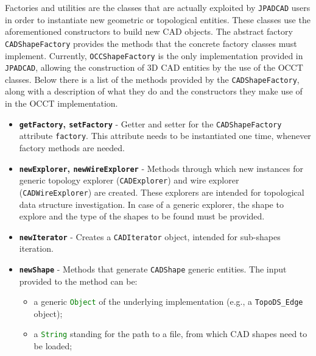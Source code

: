 Factories and utilities are the classes that are actually exploited by \lstinline[language=Java]!JPADCAD! users in order to instantiate new geometric or topological entities. These classes use the aforementioned constructors to build new \gls{CAD} objects. The abstract factory \lstinline[language=Java]!CADShapeFactory! provides the methods that the concrete factory classes must implement. Currently, \lstinline[language=Java]!OCCShapeFactory! is the only implementation provided in \lstinline[language=Java]!JPADCAD!, allowing the construction of 3D \gls{CAD} entities by the use of the \gls{OCCT} classes. Below there is a list of the methods provided by the \lstinline[language=Java]!CADShapeFactory!, along with a description of what they do and the constructors they make use of in the \gls{OCCT} implementation.
%
\begin{itemize}
\renewcommand\labelitemi{\tiny$\blacksquare$}
\renewcommand\labelitemii{\tiny$\bullet$}
\item \textbf{\lstinline[language=Java]!getFactory!, \lstinline[language=Java]!setFactory!} - Getter and setter for the \lstinline[language=Java]!CADShapeFactory! attribute \lstinline[language=Java]!factory!. This attribute needs to be instantiated one time, whenever factory methods are needed.
\item \textbf{\lstinline[language=Java]!newExplorer!, \lstinline[language=Java]!newWireExplorer!} - Methods through which new instances for generic topology explorer (\lstinline[language=Java]!CADExplorer!) and wire explorer (\lstinline[language=Java]!CADWireExplorer!) are created. These explorers are intended for topological data structure investigation. In case of a generic explorer, the shape to explore and the type of the shapes to be found must be provided.
\item \textbf{\lstinline[language=Java]!newIterator!} - Creates a \lstinline[language=Java]!CADIterator! object, intended for sub-shapes iteration.
\item \textbf{\lstinline[language=Java]!newShape!} - Methods that generate \lstinline[language=Java]!CADShape! generic entities. The input provided to the method can be:
	\begin{itemize}
	\item a generic \lstinline[language=Java]!Object! of the underlying implementation (e.g., a \lstinline[language=Java]!TopoDS_Edge! object);
	\item a \lstinline[language=Java]!String! standing for the path to a file, from which \gls{CAD} shapes need to be loaded;

\end{itemize}
\end{itemize}

